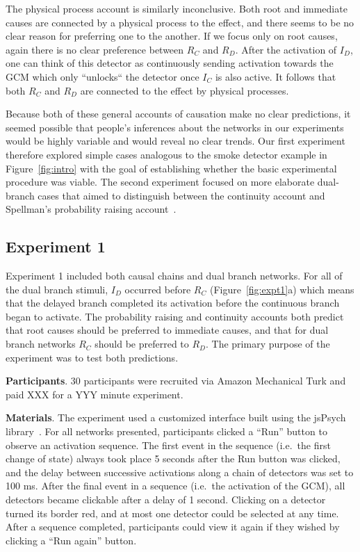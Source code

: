 \documentclass[10pt,letterpaper]{article}
\newcommand{\ev}[2]{$#1_#2$}
\begin{document}
The physical process account is similarly inconclusive. Both root and immediate causes are connected by a physical process to the effect, and there seems to be no clear reason for preferring one to the another. If we focus only on root causes, again there is no clear preference between \ev{R}{C} and \ev{R}{D}. After the activation of \ev{I}{D}, one can think of this detector as continuously sending activation towards the GCM which only ``unlocks`` the detector once \ev{I}{C} is also active. It follows that both \ev{R}{C} and \ev{R}{D} are connected to the effect by physical processes.

Because both of these general accounts of causation make no clear predictions, it seemed possible that people's inferences about the networks in our experiments would be highly variable and would reveal no clear trends. Our first experiment therefore explored simple cases analogous to the smoke detector example in Figure~\ref{fig:intro} with the goal of establishing whether the basic experimental procedure was viable.  The second experiment focused on more elaborate dual-branch cases that aimed to distinguish between the continuity account and Spellman's probability raising account~\cite{spellman97}.

\subsection{Experiment 1}

Experiment 1 included both causal chains and dual branch networks. For all of the dual branch stimuli, \ev{I}{D} occurred before \ev{R}{C} (Figure~\ref{fig:expt1}a) which means that the delayed branch completed its activation before the continuous branch began to activate. The probability raising and continuity accounts both predict that root causes should be preferred to immediate causes, and that for dual branch networks \ev{R}{C} should be preferred to \ev{R}{D}. The primary purpose of the experiment was to test both predictions. 

\textbf{Participants}. 30 participants were recruited via Amazon Mechanical Turk and paid XXX for a YYY minute experiment.



\textbf{Materials}. The experiment used a customized interface built using the jsPsych library~\cite{XXX}. For all networks presented, participants clicked a ``Run'' button to observe an activation sequence. The first event in the sequence (i.e.\ the first change of state) always took place 5 seconds after the Run button was clicked, and the delay between successive activations along a chain of detectors was set to 100 ms. After the final event in a sequence (i.e.\ the activation of the GCM), all detectors became clickable after a delay of 1 second. Clicking on a detector turned its border red, and at most one detector could be selected at any time. After a sequence completed, participants could view it again if they wished by clicking a ``Run again'' button.
\end{document}
